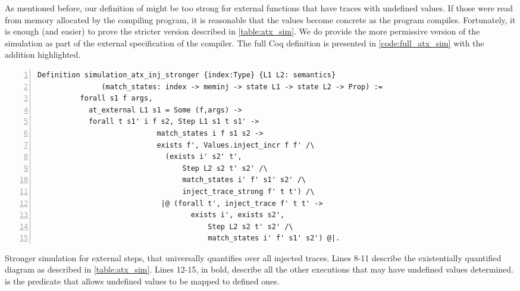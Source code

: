 As mentioned before, our definition of  might be too strong for external functions that have traces with undefined values. If those were read from memory allocated by the compiling program, it is reasonable that the values become concrete as the program compiles. Fortunately, it is enough (and easier) to prove the stricter version described in \autoref{table:atx_sim}. We do provide the more permissive version of the simulation as part of the external specification of the compiler. The full Coq definition is presented in \autoref{code:full_atx_sim} with the addition highlighted.  

\begin{table}\label{fig:simulation_atxX}
\begin{lstlisting}[numbers=left] 
Definition simulation_atx_inj_stronger {index:Type} {L1 L2: semantics}
               (match_states: index -> meminj -> state L1 -> state L2 -> Prop) :=
          forall s1 f args,
            at_external L1 s1 = Some (f,args) -> 
            forall t s1' i f s2, Step L1 s1 t s1' ->
                            match_states i f s1 s2 ->
                            exists f', Values.inject_incr f f' /\
                              (exists i' s2' t',
                                  Step L2 s2 t' s2' /\
                                  match_states i' f' s1' s2' /\
                                  inject_trace_strong f' t t') /\
                             |@ (forall t', inject_trace f' t t' -> 
                              		exists i', exists s2',
                                    	Step L2 s2 t' s2' /\
                                    	match_states i' f' s1' s2') @|.
\end{lstlisting}
\caption{Stronger simulation for external steps, that universally quantifies over all injected traces. Lines 8-11 describe the existentially quantified diagram as described in \autoref{table:atx_sim}. Lines 12-15, in bold, describe all the other executions that may have undefined values determined.  is the predicate that allows undefined values to be mapped to defined ones. }\label{code:full_atx_sim}
\end{table}

